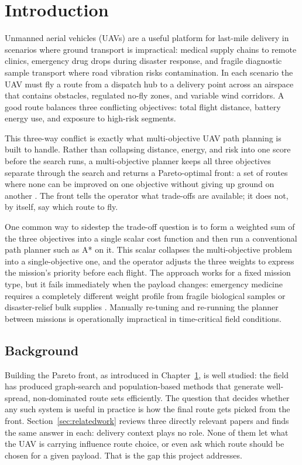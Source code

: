 \documentclass{ssnreview}
\begin{document}
\chapter{Introduction}\label{cha:intro}

Unmanned aerial vehicles (UAVs) are a useful platform for last-mile delivery in
scenarios where ground transport is impractical: medical supply chains to remote
clinics, emergency drug drops during disaster response, and fragile diagnostic sample
transport where road vibration risks contamination. In each scenario the UAV must
fly a route from a dispatch hub to a delivery point across an airspace that contains
obstacles, regulated no-fly zones, and variable wind corridors. A good route balances
three conflicting objectives: total flight distance, battery energy use, and exposure to
high-risk segments.

This three-way conflict is exactly what multi-objective UAV path planning is built to
handle. Rather than collapsing distance, energy, and risk into one score before the
search runs, a multi-objective planner keeps all three objectives separate through the
search and returns a Pareto-optimal front: a set of routes where none can be improved on
one objective without giving up ground on another \cite{r11}. The front tells the
operator what trade-offs are available; it does not, by itself, say which route to fly.

One common way to sidestep the trade-off question is to form a weighted sum of the
three objectives into a single scalar cost function and then run a conventional path
planner such as A* on it. This scalar collapses the multi-objective problem into a
single-objective one, and the operator adjusts the three weights to express the
mission's priority before each flight. The approach works for a fixed mission type, but
it fails immediately when the payload changes: emergency medicine requires a completely
different weight profile from fragile biological samples or disaster-relief bulk
supplies \cite{r1}. Manually re-tuning and re-running the planner between missions is
operationally impractical in time-critical field conditions.

\section{Background}

Building the Pareto front, as introduced in Chapter~\ref{cha:intro}, is well studied:
the field has produced graph-search and population-based methods that generate
well-spread, non-dominated route sets efficiently. The question that decides whether
any such system is useful in practice is how the
final route gets picked from the front. Section~\ref{sec:relatedwork} reviews three
directly relevant papers and finds the same answer in each: delivery context plays no
role. None of them let what the UAV is carrying influence route choice, or even ask
which route should be chosen for a given payload. That is the gap this project
addresses.
\end{document}
